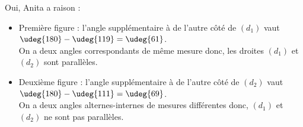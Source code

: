    Oui, Anita a raison : \\
   \begin{itemize}
      \item Première figure : l'angle supplémentaire à  de l'autre côté de $(d_1)$ vaut $\udeg{180}-\udeg{119} =\udeg{61}$. \\
      On a deux angles correspondants de même mesure donc, {\blue les droites $(d_1)$ et $(d_2)$ sont parallèles}.
      \item Deuxième figure : l'angle supplémentaire à  de l'autre côté de $(d_2)$ vaut $\udeg{180}-\udeg{111} =\udeg{69}$. \\
      On a deux angles alternes-internes de mesures différentes donc, {\blue $(d_1)$ et $(d_2)$ ne sont pas parallèles}.
   \end{itemize}
